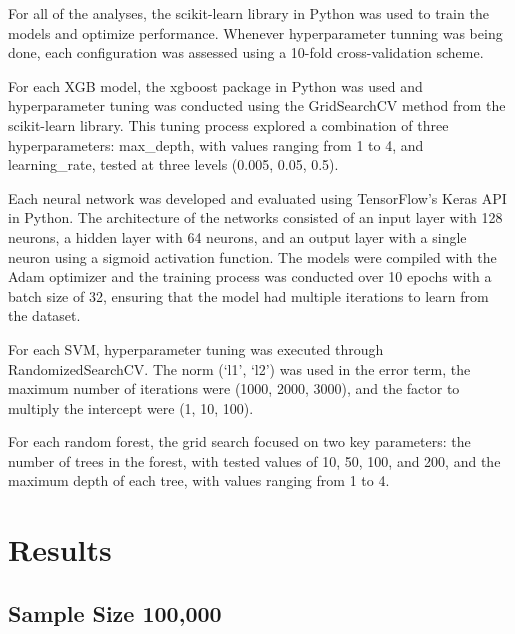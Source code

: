 \documentclass[
  man]{apa7}
\begin{document}
For all of the analyses, the scikit-learn library in Python was used to train the models and optimize performance. Whenever hyperparameter tunning was being done, each configuration was assessed using a 10-fold cross-validation scheme.

For each XGB model, the xgboost package in Python was used and hyperparameter tuning was conducted using the GridSearchCV method from the scikit-learn library. This tuning process explored a combination of three hyperparameters: max\_depth, with values ranging from 1 to 4, and learning\_rate, tested at three levels (0.005, 0.05, 0.5).

Each neural network was developed and evaluated using TensorFlow's Keras API in Python. The architecture of the networks consisted of an input layer with 128 neurons, a hidden layer with 64 neurons, and an output layer with a single neuron using a sigmoid activation function. The models were compiled with the Adam optimizer and the training process was conducted over 10 epochs with a batch size of 32, ensuring that the model had multiple iterations to learn from the dataset.

For each SVM, hyperparameter tuning was executed through RandomizedSearchCV. The norm (`l1', `l2') was used in the error term, the maximum number of iterations were (1000, 2000, 3000), and the factor to multiply the intercept were (1, 10, 100).

For each random forest, the grid search focused on two key parameters: the number of trees in the forest, with tested values of 10, 50, 100, and 200, and the maximum depth of each tree, with values ranging from 1 to 4.

\section{Results}\label{results}

\subsection{Sample Size 100,000}\label{sample-size-100000}
\end{document}
